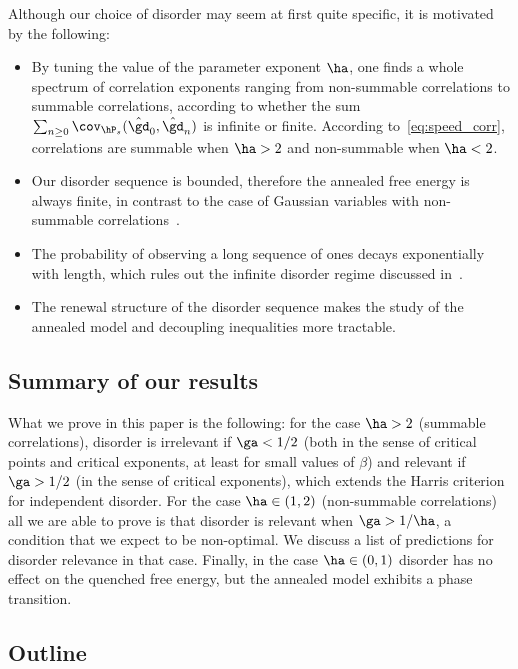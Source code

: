 Although our choice of disorder may seem at first quite specific, it is motivated by the following:
\begin{itemize}
\item By tuning the value of the parameter exponent $\ha$, one finds a whole spectrum of correlation exponents ranging from non-summable correlations to sum\-mable correlations, according to whether the sum $\sum_{n \geq 0} \cov_{\hP_s}(\hat \gd_0, \hat \gd_n)$ is infinite or finite. According to~\eqref{eq:speed_corr}, correlations are summable when $\ha > 2$ and non-summable when $\ha < 2$.

\item Our disorder sequence is bounded, therefore the annealed free energy is always finite, in contrast to the case of Gaussian variables with non-summable correlations~\cite{B13}.

\item The probability of observing a long sequence of ones decays exponentially with length, which rules out the infinite disorder regime discussed in~\cite{B14}.

\item The renewal structure of the disorder sequence makes the study of the annealed model and decoupling inequalities more tractable.
\end{itemize}

\subsection{Summary of our results}

What we prove in this paper is the following: for the case $\ha > 2$ (summable correlations), disorder is irrelevant if $\ga < 1/2$ (both in the sense of critical points and critical exponents, at least for small values of $\beta$) and relevant if $\ga > 1/2$ (in the sense of critical exponents), which extends the Harris criterion for independent disorder. For the case $\ha \in (1,2)$ (non-summable correlations) all we are able to prove is that disorder is relevant when $\ga > 1/\ha$, a condition that we expect to be non-optimal. We discuss a list of predictions for disorder relevance in that case. Finally, in the case $\ha \in (0,1)$ disorder has no effect on the quenched free energy, but the annealed model exhibits a phase transition.

\subsection{Outline}

